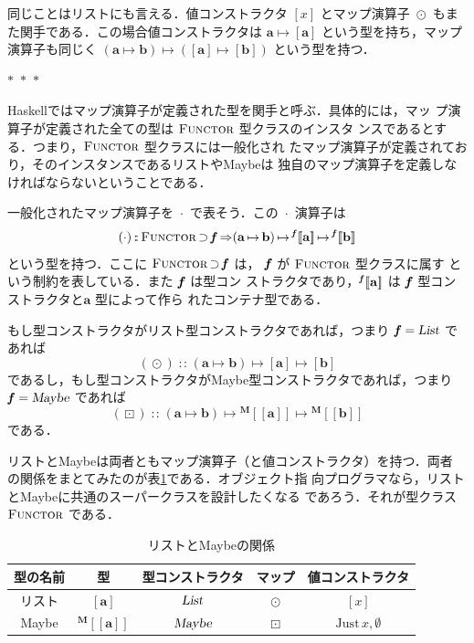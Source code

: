 \documentclass[a5paper,twoside,fleqn,draft]{jsbook}
\def\[{[\![}
\def\]{]\!]}
\newcommand{\separator}{\begin{center}$*$~$*$~$*$\end{center}}
\newcommand{\programminglanguage}[1]{\textsf{#1}}
\newcommand{\haskell}{\programminglanguage{Haskell}}
\DeclareMathOperator{\mSuperClass}{\Rightarrow}
\DeclareMathOperator{\mSuperSet}{\supset}
\newcommand{\mNothing}{\emptyset}
\DeclareMathOperator{\mIn}{{:\!:}}
\DeclareMathOperator{\mMap}{\cdot}
\DeclareMathOperator{\mMapList}{\odot}
\DeclareMathOperator{\mMapMaybe}{\boxdot}
\DeclareMathOperator{\mMapsTo}{\mapsto}
\newcommand{\mType}[1]{\mathbf{#1}} %
\newcommand{\mPolymorphicTypeParameter}[1]{\textbf{\textit{#1}}}
\newcommand{\mA}{\mType{a}}
\newcommand{\mB}{\mType{b}}
\newcommand{\mTypeAssemble}[2]{{}^\mType{#1}\[\mType{#2}\]}
\newcommand{\mPolymorphicTypeAssemble}[2]{{}^\mPolymorphicTypeParameter{#1}\[\mType{#2}\]}
\newcommand{\mMaybeType}[1]{\mTypeAssemble{M}{#1}}
\newcommand{\mTypeConstructor}[1]{\textsl{#1}}
\DeclareMathOperator{\mListTypeConstructor}{\mTypeConstructor{List}}
\DeclareMathOperator{\mMaybeTypeConstructor}{\mTypeConstructor{Maybe}}
\newcommand{\mValueConstructor}[1]{\mathrm{#1}}
\newcommand{\mValueWith}[2]{\mValueConstructor{#1}\,#2}
\newcommand{\mJustWith}[1]{\mValueWith{Just}{#1}}
\newcommand{\mTypeClass}[1]{\textsc{#1}} %
\newcommand{\mFunctorTypeClass}{\mTypeClass{Functor}}
\begin{document}
同じことはリストにも言える．値コンストラクタ $[x]$ とマップ演算子
$\mMapList$ もまた関手である．この場合値コンストラクタは
$\mA\mMapsTo[\mA]$ という型を持ち，マップ演算子も同じく
$(\mA\mMapsTo\mB)\mMapsTo([\mA]\mMapsTo[\mB])$ という型を持つ．

\separator

\haskell ではマップ演算子が定義された型を関手と呼ぶ．具体的には，マッ
プ演算子が定義された全ての型は $\mFunctorTypeClass$ 型クラスのインスタ
ンスであるとする．つまり，$\mFunctorTypeClass$ 型クラスには一般化され
たマップ演算子が定義されており，そのインスタンスであるリストやMaybeは
独自のマップ演算子を定義しなければならないということである．

一般化されたマップ演算子を $\mMap$ で表そう．この $\mMap$ 演算子は
\begin{equation}
  (\mMap)
  \mIn{}\mFunctorTypeClass
  \mSuperSet\mPolymorphicTypeParameter{f}
  \mSuperClass(\mA\mMapsTo\mB)
  \mMapsTo\mPolymorphicTypeAssemble{f}{a}
  \mMapsTo\mPolymorphicTypeAssemble{f}{b}
\end{equation}
という型を持つ．ここに
$\mFunctorTypeClass\mSuperSet\mPolymorphicTypeParameter{f}$ は，
$\mPolymorphicTypeParameter{f}$ が $\mFunctorTypeClass$ 型クラスに属す
という制約を表している．また $\mPolymorphicTypeParameter{f}$ は型コン
ストラクタであり，$\mPolymorphicTypeAssemble{f}{a}$ は
$\mPolymorphicTypeParameter{f}$ 型コンストラクタと$\mA$ 型によって作ら
れたコンテナ型である．

もし型コンストラクタがリスト型コンストラクタであれば，つまり
$\mPolymorphicTypeParameter{f}=\mListTypeConstructor$ であれば
\begin{equation}
  (\mMapList)
  \mIn{}(\mA\mMapsTo\mB)\mMapsTo[\mA]\mMapsTo[\mB]
\end{equation}
であるし，もし型コンストラクタがMaybe型コンストラクタであれば，つまり
$\mPolymorphicTypeParameter{f}=\mMaybeTypeConstructor$ であれば
\begin{equation}
  (\mMapMaybe)
  \mIn{}(\mA\mMapsTo\mB)\mMapsTo\mMaybeType{a}\mMapsTo\mMaybeType{b}
\end{equation}
である．

リストとMaybeは両者ともマップ演算子（と値コンストラクタ）を持つ．両者
の関係をまとてみたのが表\ref{tab:list-and-maybe}である．オブジェクト指
向プログラマなら，リストとMaybeに共通のスーパークラスを設計したくなる
であろう．それが型クラス $\mFunctorTypeClass$ である．

\begin{table}
\label{tab:list-and-maybe}
\caption{リストとMaybeの関係}
\begin{center}
\begin{tabular}{||c|c|c|c|c||}\hline
型の名前&型&型コンストラクタ&マップ&値コンストラクタ\\\hline\hline
リスト&$[\mA]$&$\mListTypeConstructor$&$\mMapList$&$[x]$\\
Maybe&$\mMaybeType{a}$&$\mMaybeTypeConstructor$&$\mMapMaybe$&$\mJustWith{x},\mNothing$\\\hline
\end{tabular}
\end{center}
\end{table}
\end{document}
